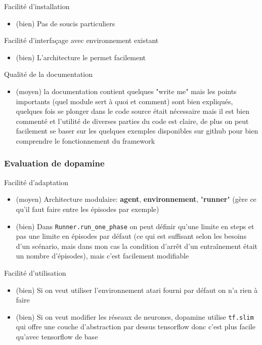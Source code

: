 \documentclass[a4paper,10pt,openany,oneside]{report}
\begin{document}
Facilité d'installation
\begin{itemize}
	\item (bien) Pas de soucis particuliers
\end{itemize}

Facilité d'interfaçage avec environnement existant
\begin{itemize}
	\item (bien) L'architecture le permet facilement
\end{itemize}

Qualité de la documentation
\begin{itemize}
	\item (moyen) la documentation \cite[]{rlDoc} contient quelques "write me" mais les points importants (quel module sert à quoi et comment) sont bien expliqués, quelques fois se plonger dans le code source était nécessaire mais il est bien commenté et l'utilité de diverses parties du code est claire, de plus on peut facilement se baser sur les quelques exemples disponibles sur github pour bien comprendre le fonctionnement du framework
\end{itemize}

\subsubsection*{Evaluation de dopamine}

Facilité d'adaptation
\begin{itemize}
	\item (moyen) Architecture modulaire: \textbf{agent}, \textbf{environnement}, "\textbf{runner}" (gère ce qu'il faut faire entre les épisodes par exemple)
	\item (bien) Dans \lstinline{Runner.run_one_phase} on peut définir qu'une limite en steps et pas une limite en épisodes par défaut (ce qui est suffisant selon les besoins d'un scénario, mais dans mon cas la condition d'arrêt d'un entraînement était un nombre d'épisodes), mais c'est facilement modifiable
\end{itemize}

Facilité d'utilisation
\begin{itemize}
	\item (bien) Si on veut utiliser l'environnement atari fourni par défaut on n'a rien à faire
	\item (bien) Si on veut modifier les réseaux de neurones, dopamine utilise \lstinline{tf.slim} qui offre une couche d'abstraction par dessus tensorflow donc c'est plus facile qu'avec tensorflow de base
\end{itemize}
\end{document}
